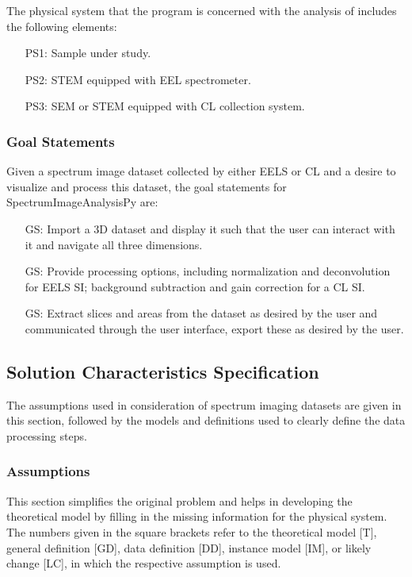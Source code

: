 \documentclass[12pt]{article}
\newcounter{goalnum} %
\newcommand{\progname}{SpectrumImageAnalysisPy} %
\begin{document}
The physical system that the program is concerned with the analysis of includes
the following elements:

\begin{itemize}
	\item[PS1:] Sample under study.
	\item[PS2:] STEM equipped with EEL spectrometer.
	\item[PS3:] SEM or STEM equipped with CL collection system.
\end{itemize}

\subsubsection{Goal Statements}

\noindent Given a spectrum image dataset collected by either EELS or CL and a
desire to visualize and process this dataset, the goal statements for
\progname{} are:

\begin{itemize}
	\item[GS\refstepcounter{goalnum}\thegoalnum \label{G_ImportDisplay}:] Import a
3D dataset and display it such that the user can interact with it and navigate
all three dimensions.
	\item[GS\refstepcounter{goalnum}\thegoalnum \label{G_Processing}:] Provide
processing options, including normalization and deconvolution for EELS SI;
background subtraction and gain correction for a CL SI.
	\item[GS\refstepcounter{goalnum}\thegoalnum \label{G_Extraction}:] Extract
slices and areas from the dataset as desired by the user and communicated
through the user interface, export these as desired by the user.
\end{itemize}

\subsection{Solution Characteristics Specification}

The assumptions used in consideration of spectrum imaging datasets are given in
this section, followed by the models and definitions used to clearly define the
data processing steps.

\subsubsection{Assumptions}

This section simplifies the original problem and helps in developing the
theoretical model by filling in the missing information for the physical
system. The numbers given in the square brackets refer to the theoretical model
[T], general definition [GD], data definition [DD], instance model [IM], or
likely change [LC], in which the respective assumption is used.
\end{document}
